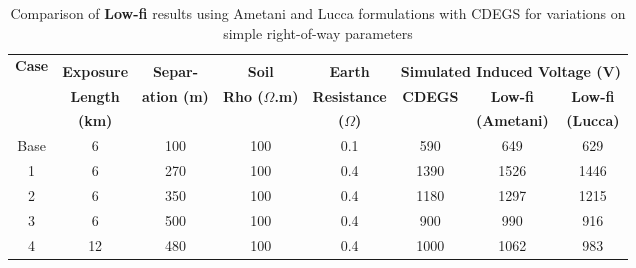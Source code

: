\documentclass{article}
\begin{document}
\begin{table}[!htp]
\caption{Comparison of \textbf{Low-fi} results using Ametani and Lucca formulations with CDEGS for variations on simple right-of-way parameters}
\label{tab:simple_cdegs2}
\begin{tabular}{@{}cccccccc@{}}
\toprule
\multirow{3}{*}{\textbf{Case}} \\& \textbf{Exposure}  & \textbf{Separ-} & \textbf{Soil} & \textbf{Earth}  & \multicolumn{3}{c}{\textbf{Simulated Induced Voltage (V)}} \\ \cmidrule(lr){6-8}
& \textbf{Length} & \textbf{ation (m)} & \textbf{Rho ($\Omega$.m)} &  \textbf{Resistance}                                                      & \textbf{CDEGS}   & \textbf{Low-fi}   & \textbf{Low-fi}  \\
& \textbf{(km)} &  &  &  \textbf{($\Omega$)} &   & \textbf{(Ametani)}  & \textbf{(Lucca)}                                         \\ \midrule
Base                              & 6                                              & 100                                      & 100                                                & 0.1                                                    & 590              & 649	& 629                                                      \\ \midrule
1                              & 6                                              & 270                                      & 100                                                & 0.4                                                    & 1390             & 1526	& 1446                                                        \\ \midrule
2                              & 6                                              & 350                                      & 100                                                & 0.4                                                    & 1180             & 1297	& 1215                                                      \\ \midrule
3                              & 6                                              & 500                                      & 100                                                & 0.4                                                    & 900              & 990	& 916                                                        \\ \midrule
4                              & 12                                             & 480                                      & 100                                                & 0.4                                                    & 1000             & 1062	& 983                                                          \\ \midrule

\end{tabular}
\end{table}
\end{document}
